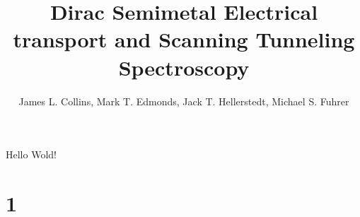 \documentclass[]{book}
\author{James L. Collins, Mark T. Edmonds, Jack T. Hellerstedt, Michael S. Fuhrer}\title{Dirac Semimetal Electrical transport and Scanning Tunneling Spectroscopy}
\begin{document}
\frontmatter
%
%
\mainmatter
Hello Wold!%

\part{1}


%



%
\backmatter
%
\end{document}
